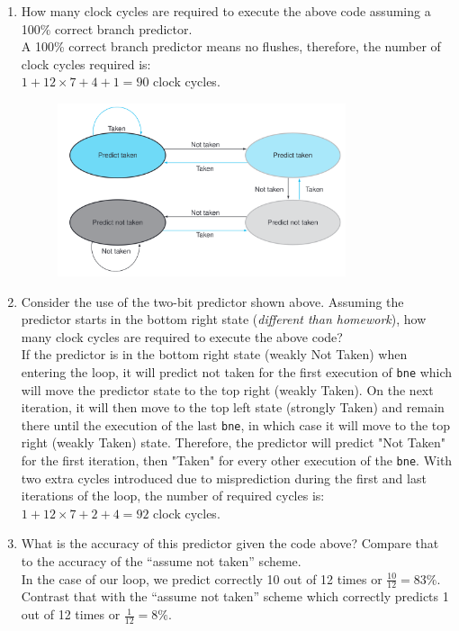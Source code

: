 \documentclass[11pt]{article}
\begin{document}
\begin{enumerate}
\begin{enumerate}
        \item How many clock cycles are required to execute the above code assuming a 100\% correct branch predictor.\\[1em]
        A 100\% correct branch predictor means no flushes, therefore, the number of clock cycles required is:\\
        $1+12\times 7+4+1=90$ clock cycles.\\
\newpage
        \begin{figure}[h!]
        \centering
        \includegraphics[width=0.80\textwidth]{Screen Shot 2020-05-14 at 21.35.45.png}
        \end{figure}
        \item Consider the use of the two-bit predictor shown above. Assuming the predictor starts in the bottom right state (\textit{different than homework}), how many clock cycles are required to execute the above code?\\[1em]
        If the predictor is in the bottom right state (weakly Not Taken) when entering the loop, it will predict not taken for the first execution of \texttt{bne} which will move the predictor state to the top right (weakly Taken). On the next iteration, it will then move to the top left state (strongly Taken) and remain there until the execution of the last \texttt{bne}, in which case it will move to the top right (weakly Taken) state. Therefore, the predictor will predict "Not Taken" for the first iteration, then "Taken" for every other execution of the \texttt{bne}. With two extra cycles introduced due to misprediction during the first and last iterations of the loop, the number of required cycles is:\\
        $1+12\times 7+2+4=92$ clock cycles.\\

        \item What is the accuracy of this predictor given the code above? Compare that to the accuracy of the “assume not taken” scheme.\\[1em]
        In the case of our loop, we predict correctly 10 out of 12 times or $\frac{10}{12}=83\%$. Contrast that with the “assume not taken” scheme which correctly predicts 1 out of 12 times or $\frac{1}{12}=8\%$.\\


\end{enumerate}
\end{enumerate}
\end{document}

